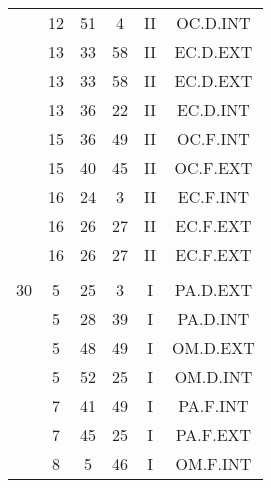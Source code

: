 \documentclass[12pt, a4paper]{article}
\begin{document}
\begin{multicols}{3}
{\begin{tabular}{c c c c c c}
	 	 	 	 & 12 & 51 & 4 & II & OC.D.INT\\%
	 	 	 	 & 13 & 33 & 58 & II & EC.D.EXT\\%
	 	 	 	 & 13 & 33 & 58 & II & EC.D.EXT\\%
	 	 	 	 & 13 & 36 & 22 & II & EC.D.INT\\%
	 	 	 	 & 15 & 36 & 49 & II & OC.F.INT\\%
	 	 	 	 & 15 & 40 & 45 & II & OC.F.EXT\\%
	 	 	 	 & 16 & 24 & 3 & II & EC.F.INT\\%
	 	 	 	 & 16 & 26 & 27 & II & EC.F.EXT\\%
	 	 	 	 & 16 & 26 & 27 & II & EC.F.EXT\\%
	 	 	 	 & & & & & \\%
	 	 	 	30 & 5 & 25 & 3 & I & PA.D.EXT\\%
	 	 	 	 & 5 & 28 & 39 & I & PA.D.INT\\%
	 	 	 	 & 5 & 48 & 49 & I & OM.D.EXT\\%
	 	 	 	 & 5 & 52 & 25 & I & OM.D.INT\\%
	 	 	 	 & 7 & 41 & 49 & I & PA.F.INT\\%
	 	 	 	 & 7 & 45 & 25 & I & PA.F.EXT\\%
	 	 	 	 & 8 & 5 & 46 & I & OM.F.INT\\%
	 	 \end{tabular}
 	}
\end{multicols}
\end{document}
